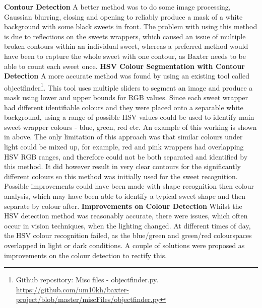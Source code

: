 \textbf{Contour Detection}
\newline
A better method was to do some image processing, Gaussian blurring, closing and opening to reliably produce a mask of a white background with some black sweets in front. The problem with using this method is due to reflections on the sweets wrappers, which caused an issue of multiple broken contours within an individual sweet, whereas a preferred method would have been to capture the whole sweet with one contour, as Baxter needs to be able to count each sweet once.
\newline\newline
\textbf{HSV Colour Segmentation with Contour Detection}
\newline
A more accurate method was found by using an existing tool called objectfinder\footnote{Github repository: Misc files - objectfinder.py. \url{https://github.com/um10kh/baxter-project/blob/master/miscFiles/objectfinder.py}}. This tool uses multiple sliders to segment an image and produce a mask using lower and upper bounds for RGB values. Since each sweet wrapper had different identifiable colours and they were placed onto a separable white background, using a range of possible HSV values could be used to identify main sweet wrapper colours - blue, green, red etc. An example of this working is shown in \textbf{} above. The only limitation of this approach was that similar colours under light could be mixed up, for example, red and pink wrappers had overlapping HSV RGB ranges, and therefore could not be both separated and identified by this method. It did however result in very clear contours for the significantly different colours so this method was initially used for the sweet recognition. Possible improvements could have been made with shape recognition then colour analysis, which may have been able to identify a typical sweet shape and then separate by colour after.
\newline\newline
\textbf{Improvements on Colour Detection}
\newline
Whilst the HSV detection method was reasonably accurate, there were issues, which often occur in vision techniques, when the lighting changed. At different times of day, the HSV colour recognition failed, as the blue/green and green/red colourspaces overlapped in light or dark conditions. A couple of solutions were proposed as improvements on the colour detection to rectify this.
\newline\newline
